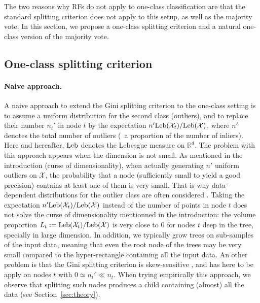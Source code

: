 The two reasons why RFs do not apply to one-class classification are that the standard splitting criterion does not apply to this setup, as well as the majority vote. In this section, we propose a one-class splitting criterion and a natural one-class version of the majority vote.


\subsection{One-class splitting criterion}
\label{sec:one-class-crit}
\paragraph{Naive approach.}
A naive approach to extend the Gini splitting criterion to the one-class setting is to assume a  uniform distribution for the second class (outliers), and to replace their number $n_t'$ in node $t$ by the expectation $n' \text{Leb}(\mathcal{X}_t) / \text{Leb}(\mathcal{X})$, where $n'$ denotes the total number of outliers (\eg~a proportion of the number of inliers).
Here and hereafter, $\text{Leb}$ denotes the Lebesgue measure on $\mathbb{R}^d$.
%
The problem with this approach appears when the dimension is not small. As mentioned in the introduction (curse of dimensionality),
when actually generating $n'$ uniform outliers on $\mathcal{X}$, the probability that a node (sufficiently small to yield a good precision) contains at least one of them is very small. That is why data-dependent distributions for the outlier class are often considered \cite{Desir12, Shi2012}.
%
Taking the expectation $n' \text{Leb}(\mathcal{X}_t) / \text{Leb}(\mathcal{X})$ instead of the number of points in node $t$ does not solve the curse of dimensionality mentionned in the introduction:
the volume proportion $L_t:=\text{Leb}(\mathcal{X}_t) / \text{Leb}(\mathcal{X})$ is very close to $0$ for nodes $t$ deep in the tree, specially in large dimension.
%
In addition, we typically grow trees on sub-samples of the input data, meaning that even the root node of the trees may be very small compared to the hyper-rectangle containing all the input data.
%
An other problem is that the Gini splitting criterion is skew-sensitive \citep{Flach2003}, and has here to be apply on nodes $t$ with $0 \simeq n_t' \ll n_t$. When trying empirically this approach, we observe that splitting such nodes produces a child containing (almost) all the data (see Section~\ref{sec:theory}).

